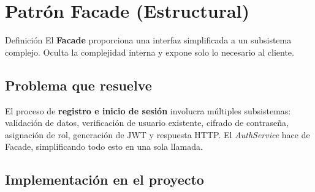 \documentclass[12pt,a4paper]{article}
\begin{document}
\newpage
\section{Patr\'on Facade (Estructural)}

\begin{patronbox}{Definici\'on}
El \textbf{Facade} proporciona una interfaz simplificada a un subsistema complejo. Oculta la complejidad interna y expone solo lo necesario al cliente.
\end{patronbox}

\subsection{Problema que resuelve}

El proceso de \textbf{registro e inicio de sesi\'on} involucra m\'ultiples subsistemas: validaci\'on de datos, verificaci\'on de usuario existente, cifrado de contrase\~na, asignaci\'on de rol, generaci\'on de JWT y respuesta HTTP. El \textit{AuthService} hace de Facade, simplificando todo esto en una sola llamada.

\subsection{Implementaci\'on en el proyecto}
\end{document}

